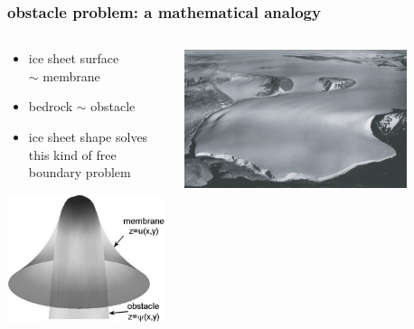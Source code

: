 \documentclass[10pt,hyperref={pdfpagelabels=true}]{beamer}
\begin{document}
\begin{frame}
  \frametitle{obstacle problem: a mathematical analogy}

\begin{columns}
\begin{column}{0.35\textwidth}
\begin{itemize}
\item ice sheet surface \\ $\sim$ \alert{membrane}
\item bedrock $\sim$ \alert{obstacle}
\item ice sheet shape solves this kind of \alert{free boundary problem}
\end{itemize}
\vfill
\begin{center}
\includegraphics[width=1.0\textwidth]{classicalobs}
\end{center}
\end{column}
\begin{column}{0.65\textwidth}
\begin{center}
\includegraphics[width=0.8\textwidth]{polaris} \\

\end{center}
\end{column}
\end{columns}
\end{frame}
\end{document}

